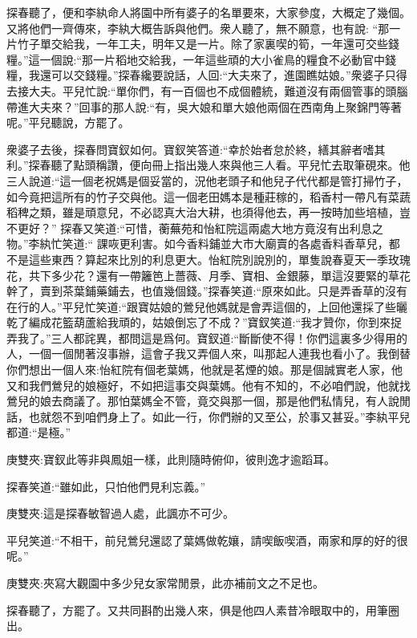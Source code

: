 \begin{parag}
    探春聽了，便和李紈命人將園中所有婆子的名單要來，大家參度，大概定了幾個。又將他們一齊傳來，李紈大概告訴與他們。衆人聽了，無不願意，也有說: “那一片竹子單交給我，一年工夫，明年又是一片。除了家裏喫的筍，一年還可交些錢糧。”這一個說:“那一片稻地交給我，一年這些頑的大小雀鳥的糧食不必動官中錢糧，我還可以交錢糧。”探春纔要說話，人回:“大夫來了，進園瞧姑娘。”衆婆子只得去接大夫。平兒忙說:“單你們，有一百個也不成個體統，難道沒有兩個管事的頭腦帶進大夫來？”回事的那人說:“有，吳大娘和單大娘他兩個在西南角上聚錦門等著呢。”平兒聽說，方罷了。
\end{parag}


\begin{parag}
    衆婆子去後，探春問寶釵如何。寶釵笑答道:“幸於始者怠於終，繕其辭者嗜其利。”探春聽了點頭稱讚，便向冊上指出幾人來與他三人看。平兒忙去取筆硯來。他三人說道:“這一個老祝媽是個妥當的，況他老頭子和他兒子代代都是管打掃竹子，如今竟把這所有的竹子交與他。這一個老田媽本是種莊稼的，稻香村一帶凡有菜蔬稻稗之類，雖是頑意兒，不必認真大治大耕，也須得他去，再一按時加些培植，豈不更好？” 探春又笑道:“可惜，蘅蕪苑和怡紅院這兩處大地方竟沒有出利息之物。”李紈忙笑道:“ 課咴更利害。如今香料鋪並大市大廟賣的各處香料香草兒，都不是這些東西？算起來比別的利息更大。怡紅院別說別的，單隻說春夏天一季玫瑰花，共下多少花？還有一帶籬笆上薔薇、月季、寶相、金銀藤，單這沒要緊的草花幹了，賣到茶葉鋪藥鋪去，也值幾個錢。”探春笑道:“原來如此。只是弄香草的沒有在行的人。”平兒忙笑道:“跟寶姑娘的鶯兒他媽就是會弄這個的，上回他還採了些曬乾了編成花籃葫蘆給我頑的，姑娘倒忘了不成？”寶釵笑道:“我才贊你，你到來捉弄我了。”三人都詫異，都問這是爲何。寶釵道:“斷斷使不得！你們這裏多少得用的人，一個一個閒著沒事辦，這會子我又弄個人來，叫那起人連我也看小了。我倒替你們想出一個人來:怡紅院有個老葉媽，他就是茗煙的娘。那是個誠實老人家，他又和我們鶯兒的娘極好，不如把這事交與葉媽。他有不知的，不必咱們說，他就找鶯兒的娘去商議了。那怕葉媽全不管，竟交與那一個，那是他們私情兒，有人說閒話，也就怨不到咱們身上了。如此一行，你們辦的又至公，於事又甚妥。”李紈平兒都道:“是極。”\begin{note}庚雙夾:寶釵此等非與鳳姐一樣，此則隨時俯仰，彼則逸才逾蹈耳。\end{note}探春笑道:“雖如此，只怕他們見利忘義。”\begin{note}庚雙夾:這是探春敏智過人處，此諷亦不可少。\end{note}平兒笑道:“不相干，前兒鶯兒還認了葉媽做乾孃，請喫飯喫酒，兩家和厚的好的很呢。”\begin{note}庚雙夾:夾寫大觀園中多少兒女家常閒景，此亦補前文之不足也。\end{note}探春聽了，方罷了。又共同斟酌出幾人來，俱是他四人素昔冷眼取中的，用筆圈出。
\end{parag}


